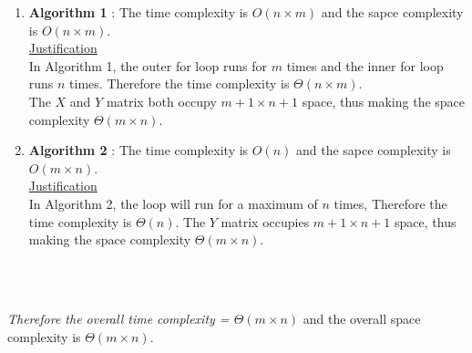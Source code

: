 \documentclass[12pt,letterpaper]{article}
\begin{document}
        \begin{enumerate}
            \item \textbf{Algorithm 1} : The time complexity is $O(n \times m)$ and the sapce complexity is $O(n \times m)$. \\

            \underline{Justification} \\

            In Algorithm 1, the outer for loop runs for $m$ times and the inner for loop runs $n$ times. Therefore the time complexity is $\Theta(n \times m)$.\\ The $X$ and $Y$ matrix both occupy $m+1 \times n+1$ space, thus making the space complexity $\Theta(m \times n)$.

            \item \textbf{Algorithm 2} : The time complexity is $O(n)$ and the sapce complexity is $O(m \times n)$. \\

            \underline{Justification} \\

            In Algorithm 2, the loop will run for a maximum of $n$ times, Therefore the time complexity is $\Theta(n)$. The $Y$ matrix occupies $m+1 \times n+1$ space, thus making the space complexity $\Theta(m \times n)$.

            \\\\

        \end{enumerate}

        \emph{Therefore the overall time complexity = $\Theta(m \times n)$} and the overall space complexity is $\Theta(m \times n)$.
\end{document}
